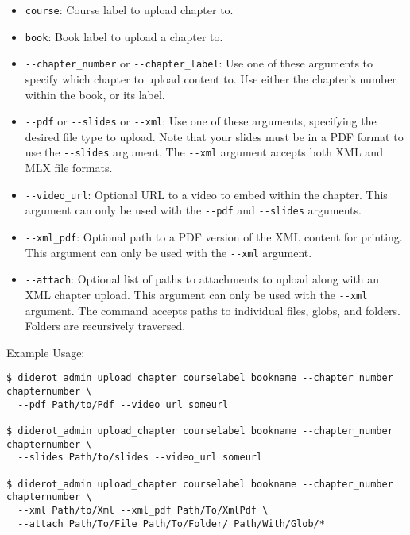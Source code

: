 \begin{itemize}
  \item \verb|course|: Course label to upload chapter to.
  \item \verb|book|: Book label to upload a chapter to.

  \item \verb|--chapter_number| or \verb|--chapter_label|: Use one of these arguments to specify which chapter to upload content to. Use either the chapter's number within the book, or its label.

  \item \verb|--pdf| or \verb|--slides| or \verb|--xml|: Use one of these arguments, specifying the desired file type to upload. Note that your slides must be in a PDF format to use the \verb|--slides| argument. The \verb|--xml| argument accepts both XML and MLX file formats.

  \item \verb|--video_url|: Optional URL to a video to embed within the chapter. This argument can only be used with the \verb|--pdf| and \verb|--slides| arguments.

  \item \verb|--xml_pdf|: Optional path to a PDF version of the XML content for printing. This argument can only be used with the \verb|--xml| argument.

  \item \verb|--attach|: Optional list of paths to attachments to upload along with an XML chapter upload. This argument can only be used with the \verb|--xml| argument. The command accepts paths to individual files, globs, and folders. Folders are recursively traversed.
\end{itemize}

Example Usage:
\begin{verbatim}
$ diderot_admin upload_chapter courselabel bookname --chapter_number chapternumber \
  --pdf Path/to/Pdf --video_url someurl

$ diderot_admin upload_chapter courselabel bookname --chapter_number chapternumber \
  --slides Path/to/slides --video_url someurl

$ diderot_admin upload_chapter courselabel bookname --chapter_number chapternumber \
  --xml Path/to/Xml --xml_pdf Path/To/XmlPdf \
  --attach Path/To/File Path/To/Folder/ Path/With/Glob/*
\end{verbatim}

